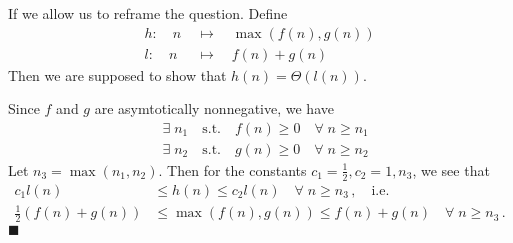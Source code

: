 \documentclass{article}
\begin{document}
If we allow us to reframe the question. Define
\begin{align*}
	h \!:\quad n \;&\mapsto\quad \max(f(n), g(n)) \\
	l \!:\quad n \;&\mapsto\quad f(n) + g(n)
\end{align*}
Then we are supposed to show that $h(n) = \Theta(l(n))$.

\noindent
Since $f$ and $g$ are asymtotically nonnegative, we have
\begin{align*}
	& \exists\; n_1 \quad\textrm{s.t.}\quad f(n) \ge 0 \quad\forall\; n \ge n_1 \\
	& \exists\; n_2 \quad\textrm{s.t.}\quad g(n) \ge 0 \quad\forall\; n \ge n_2
\end{align*}
Let $n_3 = \max(n_1, n_2)$. Then for the constants $c_1=\frac{1}{2}, c_2=1, n_3$, we see that
\begin{align*}
	c_1 l(n) &\le h(n) \le c_2 l(n) \quad\forall\; n \ge n_3\,, \quad \textrm{i.e.}\\
	\frac{1}{2}(f(n) + g(n)) &\le \max\left(f(n), g(n)\right) \le f(n) + g(n) \quad\forall\; n \ge n_3\,.
\end{align*}
\hfill$\blacksquare$
\end{document}
